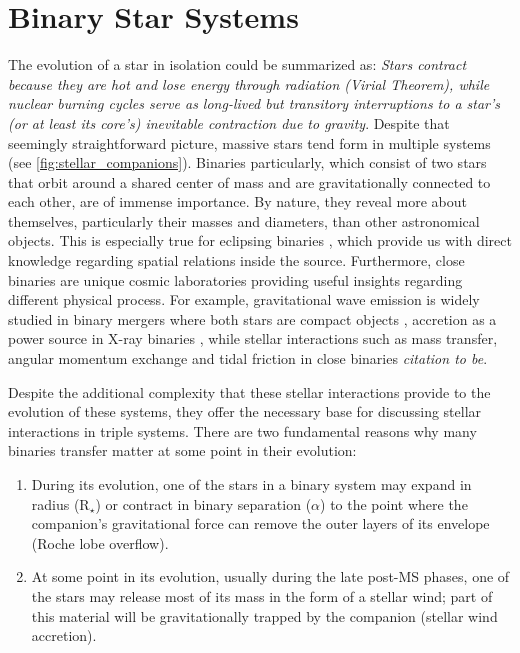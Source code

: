 

\section{Binary Star Systems}

The evolution of a star in isolation could be summarized as: {\it Stars contract because they are hot and lose energy through radiation (Virial Theorem), while nuclear burning cycles serve as long-lived but transitory interruptions to a star's (or at least its core's) inevitable contraction due to gravity}. Despite that seemingly straightforward picture, massive stars tend form in multiple systems (see \cref{fig:stellar_companions}). Binaries particularly, which consist of two stars that orbit around a shared center of mass and are gravitationally connected to each other, are of immense importance. By nature,  they reveal more about themselves, particularly their masses and diameters, than other astronomical objects. This is especially true for eclipsing binaries \citep{prvsa2016physics}, which provide us with direct knowledge regarding spatial relations inside the source. Furthermore, close binaries are unique cosmic laboratories providing useful insights regarding different physical process. For example, gravitational wave emission is widely studied in binary mergers where both stars are compact objects \citep{cutler1994gravitational,abbott2017gw170608,abbott2019gwtc}, accretion as a power source in X-ray binaries \citep{lewin1997x,reig2011x}, while stellar interactions such as mass transfer, angular momentum exchange and tidal friction in close binaries {\it citation to be}. 

Despite the additional complexity that these stellar interactions provide to the evolution of these systems, they offer the necessary base for discussing stellar interactions in triple systems.  There are two fundamental reasons why many binaries transfer matter at some point in their evolution:

\begin{enumerate}
    \item During its evolution, one of the stars in a binary system may expand in radius (R$_{\star}$) or contract in binary separation (${\alpha}$) to the point where the companion's gravitational force can remove the outer layers of its envelope (Roche lobe overflow).
    \item At some point in its evolution, usually during the late post-MS phases, one of the stars may release most of its mass in the form of a stellar wind; part of this material will be gravitationally trapped by the companion (stellar wind accretion). 
\end{enumerate}


